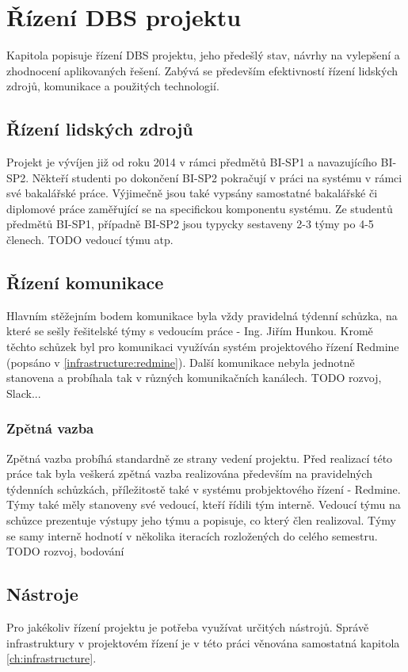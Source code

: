 \chapter{Řízení DBS projektu} \label{DBSmanagement}

Kapitola popisuje řízení DBS projektu, jeho předešlý stav, návrhy na vylepšení a zhodnocení aplikovaných řešení. Zabývá se především efektivností řízení lidských zdrojů, komunikace a použitých technologií.

\section{Řízení lidských zdrojů}

Projekt je vývíjen již od roku 2014 v rámci předmětů BI-SP1 a navazujícího BI-SP2. Někteří studenti po dokončení BI-SP2 pokračují v práci na systému v rámci své bakalářské práce. Výjimečně jsou také vypsány samostatné bakalářské či diplomové práce zaměřující se na specifickou komponentu systému.
Ze studentů předmětů BI-SP1, případně BI-SP2 jsou typycky sestaveny 2-3 týmy po 4-5 členech.
TODO vedoucí týmu atp.

\section{Řízení komunikace}

Hlavním stěžejním bodem komunikace byla vždy pravidelná týdenní schůzka, na které se sešly řešitelské týmy s vedoucím práce - Ing. Jiřím Hunkou. Kromě těchto schůzek byl pro komunikaci využíván systém projektového řízení Redmine (popsáno v \ref{infrastructure:redmine}). Další komunikace nebyla jednotně stanovena a probíhala tak v různých komunikačních kanálech.
TODO rozvoj, Slack...

\subsection{Zpětná vazba}

Zpětná vazba probíhá standardně ze strany vedení projektu. Před realizací této práce tak byla veškerá zpětná vazba realizována především na pravidelných týdenních schůzkách, příležitostě také v systému probjektového řízení - Redmine.
Týmy také měly stanoveny své vedoucí, kteří řídili tým interně. Vedoucí týmu na schůzce prezentuje výstupy jeho týmu a popisuje, co který člen realizoval. Týmy se samy interně hodnotí v několika iteracích rozložených do celého semestru.
TODO rozvoj, bodování

\section{Nástroje}

Pro jakékoliv řízení projektu je potřeba využívat určitých nástrojů. Správě infrastruktury v projektovém řízení je v této práci věnována samostatná kapitola \ref{ch:infrastructure}.

